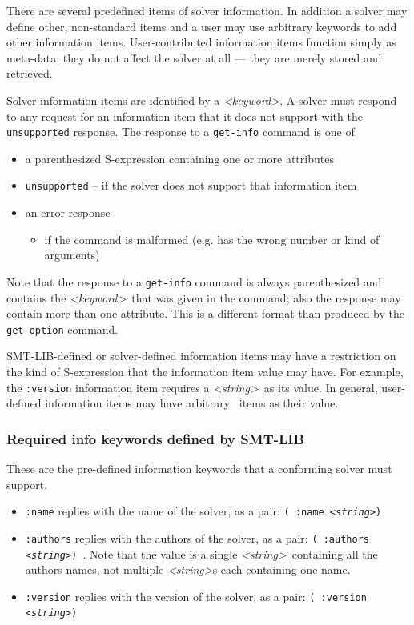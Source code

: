 \documentclass[12pt,oneside]{report}
\newcommand{\keyword}{{\it <keyword>}}
\newcommand{\attrvalue}{{\it <attr-value>}}
\newcommand{\strng}{{\it <string>}} %
\newcommand{\nospace}{\setlength{\itemsep}{0in}\setlength{\parsep}{0in}\setlength{\parskip}{0in}\setlength{\topsep}{0in}}
\begin{document}
There are several predefined items of solver information.  In addition a solver may define other, non-standard items and a user may
use arbitrary keywords to add other information items. User-contributed information items function simply as meta-data; they do not
affect the solver at all --- they are merely stored and retrieved.  

Solver information items are identified by a \keyword. A solver must respond to any request for an information item 
that it does not support with the {\tt unsupported} response. The response to a {\tt get-info} command is one of
\begin{itemize} \nospace
\item a parenthesized S-expression containing one or more attributes
\item {\tt unsupported} -- if the solver does not support that information item
\item an error response
\begin{itemize} \nospace
\item if the command is malformed (e.g. has the wrong number or kind of arguments)
\end{itemize}
\end{itemize}
Note that the response to a {\tt get-info} command is always parenthesized and contains the \keyword~that was given in the
command; also the response may contain more than one attribute. This is a different format than produced by the {\tt get-option} command.

SMT-LIB-defined or solver-defined information items may have a restriction on the kind of S-expression that the information item
value may have.  For example, the {\tt :version} information item requires a \strng\ as its value. In general, user-defined information items
may have arbitrary \attrvalue\ items as their value.


\subsubsection{Required info keywords defined by SMT-LIB}
These are the pre-defined information keywords that a conforming solver must support. 
\begin{itemize}
\item[]{\tt :name} replies with the name of the solver, as a pair: {\tt ( :name \strng ) }
\item[]{\tt :authors} replies with the authors of the solver, as a pair: {\tt ( :authors \strng ) }.
Note that the value is a single \strng~containing all the authors names, not multiple \strng s each containing one name.

\item[] {\tt :version} replies with the version of the solver, as a pair: {\tt ( :version \strng ) }
\end{itemize}
\end{document}
